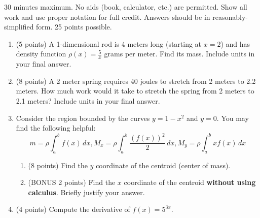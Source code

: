\documentclass[12pt]{article}
\newcommand{\ds}{\displaystyle}
\begin{document}
30 minutes maximum.  No aids (book, calculator, etc.) are permitted.
Show all work and use proper notation for full credit.  Answers should
be in reasonably-simplified form.  25 points possible.

\begin{enumerate}
\item (5 points) A 1-dimensional rod is 4 meters long (starting at
  $x=2$) and
  has density function $\rho(x) = \frac{5}{x}$ grams per meter. Find its
  mass. Include units in your final answer.
  \vfill

\item (8 points) A 2 meter spring requires 40 joules to stretch from 2
  meters to 2.2 meters. How much work would it take to stretch the
  spring from 2 meters to 2.1 meters? Include units in your final
  answer.
  \vfill
  \vfill
  \vfill

  \newpage

\item Consider
  the region bounded by the curves $\ds y=1-x^2$ and $y=0$.
  You may find the following helpful:
  $$
  m=\rho \int_a^b f(x) \, dx, M_x = \rho \int_a^b \frac{(f(x))^2}{2} \, dx , M_y = \rho \int_a^b xf(x) \, dx
  $$
  \begin{enumerate}
  \item (8 points) Find the $y$ coordinate of the centroid (center of
    mass).
    \vfill
    \vfill
    \vfill
    
  \item (BONUS 2 points) Find the $x$ coordinate of the centroid
    {\bf without using calculus}. Briefly justify your answer.
    \vfill
  \end{enumerate}

\item (4 points) Compute the derivative of $f(x) = 5^{3x}$.
  \vfill
  
  
\end{enumerate}
\end{document}
